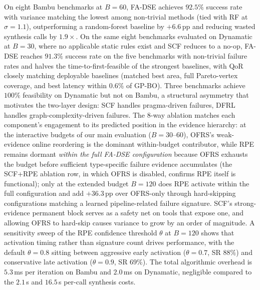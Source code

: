 \documentclass[journal]{IEEEtran}
\begin{document}
On eight Bambu benchmarks at $B{=}60$, FA-DSE achieves $92.5\%$ success rate with variance matching the lowest among non-trivial methods (tied with RF at $\sigma{=}1.1$), outperforming a random-forest baseline by $+6.6$\,pp and reducing wasted synthesis calls by $1.9\times$. On the same eight benchmarks evaluated on Dynamatic at $B{=}30$, where no applicable static rules exist and SCF reduces to a no-op, FA-DSE reaches $91.3\%$ success rate on the five benchmarks with non-trivial failure rates and halves the time-to-first-feasible of the strongest baselines, with QoR closely matching deployable baselines (matched best area, full Pareto-vertex coverage, and best latency within $0.6\%$ of GP-BO). Three benchmarks achieve $100\%$ feasibility on Dynamatic but not on Bambu, a structural asymmetry that motivates the two-layer design: SCF handles pragma-driven failures, DFRL handles graph-complexity-driven failures. The 8-way ablation matches each component's engagement to its predicted position in the evidence hierarchy: at the interactive budgets of our main evaluation ($B{=}30$--$60$), OFRS's weak-evidence online reordering is the dominant within-budget contributor, while RPE remains dormant \emph{within the full FA-DSE configuration} because OFRS exhausts the budget before sufficient type-specific failure evidence accumulates (the SCF+RPE ablation row, in which OFRS is disabled, confirms RPE itself is functional); only at the extended budget $B{=}120$ does RPE activate within the full configuration and add $+36.3$\,pp over OFRS-only through hard-skipping configurations matching a learned pipeline-related failure signature. SCF's strong-evidence permanent block serves as a safety net on tools that expose one, and allowing OFRS to hard-skip causes variance to grow by an order of magnitude. A sensitivity sweep of the RPE confidence threshold $\theta$ at $B{=}120$ shows that activation timing rather than signature count drives performance, with the default $\theta{=}0.8$ sitting between aggressive early activation ($\theta{=}0.7$, SR $88\%$) and conservative late activation ($\theta{=}0.9$, SR $69\%$). The total algorithmic overhead is $5.3$\,ms per iteration on Bambu and $2.0$\,ms on Dynamatic, negligible compared to the $2.1$\,s and $16.5$\,s per-call synthesis costs.
\end{document}
